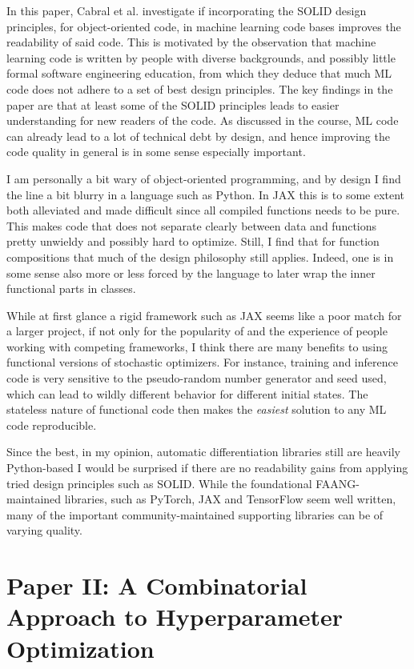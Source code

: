 \documentclass[11pt]{diazessay}
\begin{document}
In this paper, Cabral et al. investigate if incorporating the SOLID design principles, for object-oriented code, in machine learning code bases improves the readability of said code. This is motivated by the observation that machine learning code is written by people with diverse backgrounds, and possibly little formal software engineering education, from which they deduce that much ML code does not adhere to a set of best design principles. The key findings in the paper are that at least some of the SOLID principles leads to easier understanding for new readers of the code. As discussed in the course, ML code can already lead to a lot of technical debt by design, and hence improving the code quality in general is in some sense especially important.

I am personally a bit wary of object-oriented programming, and by design I find the line a bit blurry in a language such as Python. In JAX this is to some extent both alleviated and made difficult since all compiled functions needs to be pure. This makes code that does not separate clearly between data and functions pretty unwieldy and possibly hard to optimize. Still, I find that for function compositions that much of the design philosophy still applies. Indeed, one is in some sense also more or less forced by the language to later wrap the inner functional parts in classes.

While at first glance a rigid framework such as JAX seems like a poor match for a larger project, if not only for the popularity of and the experience of people working with competing frameworks, I think there are many benefits to using functional versions of stochastic optimizers. For instance, training and inference code is very sensitive to the pseudo-random number generator and seed used, which can lead to wildly different behavior for different initial states. The stateless nature of functional code then makes the \textit{easiest} solution to any ML code reproducible.

Since the best, in my opinion, automatic differentiation libraries still are heavily Python-based I would be surprised if there are no readability gains from applying tried design principles such as SOLID. While the foundational FAANG-maintained libraries, such as PyTorch, JAX and TensorFlow seem well written, many of the important community-maintained supporting libraries can be of varying quality.

\section*{Paper II: A Combinatorial Approach to Hyperparameter Optimization\cite{khadka2024combinatorial}}
\end{document}
